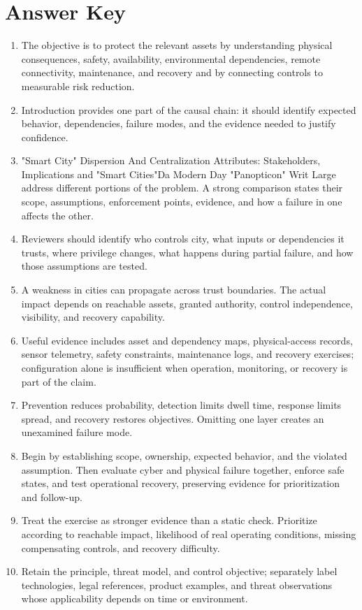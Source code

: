 \documentclass[11pt]{article}
\begin{document}
\section*{Answer Key}
\begin{enumerate}
\item The objective is to protect the relevant assets by understanding physical consequences, safety, availability, environmental dependencies, remote connectivity, maintenance, and recovery and by connecting controls to measurable risk reduction.
\item Introduction provides one part of the causal chain: it should identify expected behavior, dependencies, failure modes, and the evidence needed to justify confidence.
\item "Smart City" Dispersion And Centralization Attributes: Stakeholders, Implications and "Smart Cities"Da Modern Day "Panopticon" Writ Large address different portions of the problem. A strong comparison states their scope, assumptions, enforcement points, evidence, and how a failure in one affects the other.
\item Reviewers should identify who controls city, what inputs or dependencies it trusts, where privilege changes, what happens during partial failure, and how those assumptions are tested.
\item A weakness in cities can propagate across trust boundaries. The actual impact depends on reachable assets, granted authority, control independence, visibility, and recovery capability.
\item Useful evidence includes asset and dependency maps, physical-access records, sensor telemetry, safety constraints, maintenance logs, and recovery exercises; configuration alone is insufficient when operation, monitoring, or recovery is part of the claim.
\item Prevention reduces probability, detection limits dwell time, response limits spread, and recovery restores objectives. Omitting one layer creates an unexamined failure mode.
\item Begin by establishing scope, ownership, expected behavior, and the violated assumption. Then evaluate cyber and physical failure together, enforce safe states, and test operational recovery, preserving evidence for prioritization and follow-up.
\item Treat the exercise as stronger evidence than a static check. Prioritize according to reachable impact, likelihood of real operating conditions, missing compensating controls, and recovery difficulty.
\item Retain the principle, threat model, and control objective; separately label technologies, legal references, product examples, and threat observations whose applicability depends on time or environment.
\end{enumerate}
\end{document}
